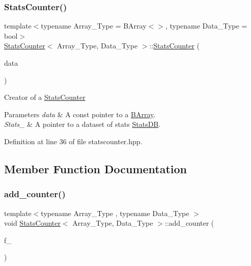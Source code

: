 \subsubsection{\texorpdfstring{Stats\+Counter()}{StatsCounter()}}
{\footnotesize\ttfamily template$<$typename Array\+\_\+\+Type  = B\+Array$<$$>$, typename Data\+\_\+\+Type  = bool$>$ \\
\hyperlink{class_stats_counter}{Stats\+Counter}$<$ Array\+\_\+\+Type, Data\+\_\+\+Type $>$\+::\hyperlink{class_stats_counter}{Stats\+Counter} (\begin{DoxyParamCaption}\item[{const Array\+\_\+\+Type $\ast$}]{data }\end{DoxyParamCaption})\hspace{0.3cm}{\ttfamily [inline]}}



Creator of a {\ttfamily \hyperlink{class_stats_counter}{Stats\+Counter}} 


\begin{DoxyParams}{Parameters}
{\em data} & A const pointer to a {\ttfamily \hyperlink{class_b_array}{B\+Array}}. \\
\hline
{\em Stats\+\_\+} & A pointer to a dataset of stats {\ttfamily \hyperlink{class_stats_d_b}{Stats\+DB}}. \\
\hline
\end{DoxyParams}


Definition at line 36 of file statscounter.\+hpp.



\subsection{Member Function Documentation}
\mbox{\label{class_stats_counter_ad175dcd2bd30d017881783de546ac333}} 
\subsubsection{\texorpdfstring{add\+\_\+counter()}{add\_counter()}}
{\footnotesize\ttfamily template$<$typename Array\+\_\+\+Type , typename Data\+\_\+\+Type $>$ \\
void \hyperlink{class_stats_counter}{Stats\+Counter}$<$ Array\+\_\+\+Type, Data\+\_\+\+Type $>$\+::add\+\_\+counter (\begin{DoxyParamCaption}\item[{\hyperlink{class_counter}{Counter}$<$ Array\+\_\+\+Type, Data\+\_\+\+Type $>$}]{f\+\_\+ }\end{DoxyParamCaption})\hspace{0.3cm}{\ttfamily [inline]}}




